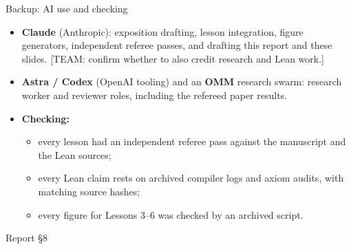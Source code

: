 \documentclass[aspectratio=169,11pt]{beamer}
\newcommand{\src}[1]{\par\vfill{\scriptsize\color{gray} Report #1}}
\begin{document}
\begin{frame}{Backup: AI use and checking}
\small
\begin{itemize}
\item \textbf{Claude} (Anthropic): exposition drafting, lesson integration, figure generators, independent referee passes, and drafting this report and these slides. [TEAM: confirm whether to also credit research and Lean work.]
\item \textbf{Astra / Codex} (OpenAI tooling) and an \textbf{OMM} research swarm: research worker and reviewer roles, including the refereed paper results.
\item \textbf{Checking:}
  \begin{itemize}
  \item every lesson had an independent referee pass against the manuscript and the Lean sources;
  \item every Lean claim rests on archived compiler logs and axiom audits, with matching source hashes;
  \item every figure for Lessons 3--6 was checked by an archived script.
  \end{itemize}
\end{itemize}
\src{\S8}
\end{frame}
\end{document}

